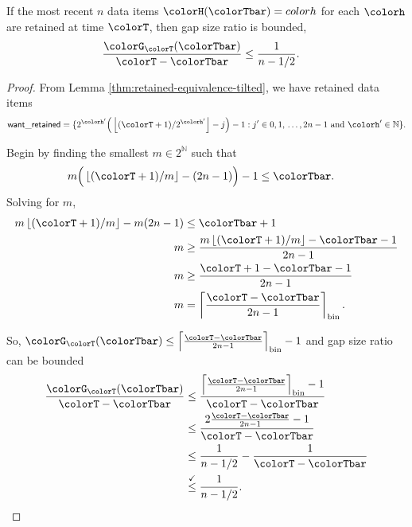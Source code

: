 \begin{lemma}
\label{thm:gap-size-ratio-tilted}
If the most recent $n$ data items $\colorH(\colorTbar) = colorh$ for each \hv{} $\colorh$ are retained at time $\colorT$, then gap size ratio is bounded,
\begin{align*}
\frac{\colorG_{\colorT}(\colorTbar)}{\colorT - \colorTbar}
&\leq
\frac{1}{n - 1/2}.
\end{align*}
\end{lemma}
\begin{proof}

From Lemma \ref{thm:retained-equivalence-tilted}, we have retained data items
\begin{align*}
\mathsf{want\_retained} =
\{
2^{\colorh'}\Big(\left\lfloor (\colorT + 1) / 2^{\colorh'} \right\rfloor - j\Big) - 1
  :
  j' \in 0,1,\,\ldots,2n-1
  \text{ and }
  \colorh' \in \mathbb{N}
\}.
\end{align*}

Begin by finding the smallest $m \in 2^{\mathbb{N}}$ such that
\begin{align*}
m\Big( \left\lfloor (\colorT + 1)/m \right\rfloor - (2n - 1)\Big) - 1
&\leq
\colorTbar.
\end{align*}
Solving for $m$,
\begin{align*}
m \left\lfloor (\colorT + 1)/m \right\rfloor - m(2n - 1)
&\leq \colorTbar + 1\\
m
&\geq \frac{
m \left\lfloor (\colorT + 1)/m \right\rfloor - \colorTbar - 1
}{2n - 1}\\
m
&\geq \frac{
\colorT + 1 - \colorTbar - 1
}{2n - 1}\\
m
&= \left\lceil \frac{\colorT - \colorTbar}{2n - 1} \right\rceil_{\mathrm{bin}}.
\end{align*}

So, $\colorG_{\colorT}(\colorTbar) \leq \left\lceil \frac{\colorT - \colorTbar}{2n - 1} \right\rceil_{\mathrm{bin}} - 1$ and gap size ratio can be bounded
\begin{align*}
\frac{\colorG_{\colorT}(\colorTbar)}{\colorT - \colorTbar}
&\leq
\frac{
\left\lceil \frac{\colorT - \colorTbar}{2n - 1} \right\rceil_{\mathrm{bin}} - 1
}{
\colorT - \colorTbar
}\\
&\leq
\frac{
2\frac{\colorT - \colorTbar}{2n - 1}
 - 1
}{
\colorT - \colorTbar
}\\
&\leq
\frac{1
}{n - 1/2}
-
\frac{1
}{
\colorT - \colorTbar
}\\
&\stackrel{\checkmark}{\leq}
\frac{1}{n - 1/2}.
\end{align*}

\end{proof}

